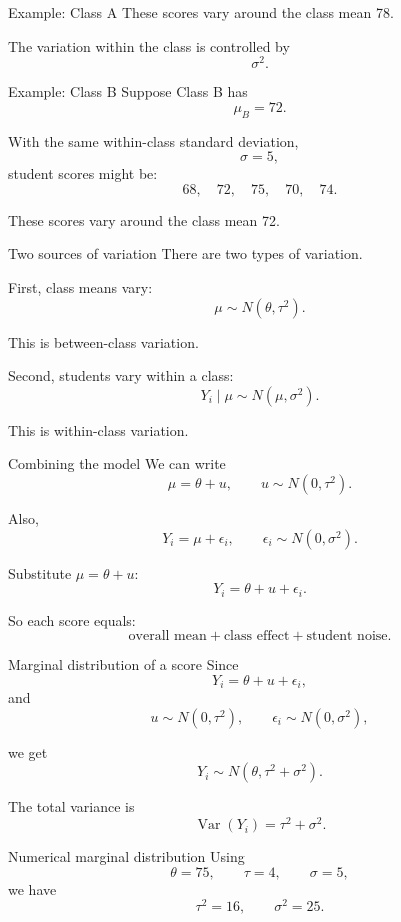 \documentclass[aspectratio=43,11pt]{beamer}
\begin{document}
{\begin{frame}{Example: Class A}
\medskip
These scores vary around the class mean 78.

\medskip
The variation within the class is controlled by
\[
\sigma^2.
\]
\end{frame}

\begin{frame}{Example: Class B}
Suppose Class B has
\[
\mu_B = 72.
\]

\medskip
With the same within-class standard deviation,
\[
\sigma = 5,
\]
student scores might be:
\[
68,\quad 72,\quad 75,\quad 70,\quad 74.
\]

These scores vary around the class mean 72.
\end{frame}

\begin{frame}{Two sources of variation}
There are two types of variation.

\medskip
First, class means vary:
\[
\mu \sim N(\theta,\tau^2).
\]

\medskip
This is between-class variation.

\medskip
Second, students vary within a class:
\[
Y_i \mid \mu \sim N(\mu,\sigma^2).
\]

\medskip
This is within-class variation.
\end{frame}

\begin{frame}{Combining the model}
We can write
\[
\mu = \theta + u,
\qquad
u \sim N(0,\tau^2).
\]

Also,
\[
Y_i = \mu + \epsilon_i,
\qquad
\epsilon_i \sim N(0,\sigma^2).
\]

Substitute \(\mu = \theta + u\):
\[
Y_i = \theta + u + \epsilon_i.
\]

So each score equals:
\[
\text{overall mean}
+
\text{class effect}
+
\text{student noise}.
\]
\end{frame}

\begin{frame}{Marginal distribution of a score}
Since
\[
Y_i = \theta + u + \epsilon_i,
\]
and
\[
u \sim N(0,\tau^2),
\qquad
\epsilon_i \sim N(0,\sigma^2),
\]

\medskip
we get
\[
Y_i \sim N(\theta,\tau^2+\sigma^2).
\]

The total variance is
\[
\operatorname{Var}(Y_i)=\tau^2+\sigma^2.
\]
\end{frame}

\begin{frame}{Numerical marginal distribution}
Using
\[
\theta = 75,
\qquad
\tau = 4,
\qquad
\sigma = 5,
\]
we have
\[
\tau^2 = 16,
\qquad
\sigma^2 = 25.
\]


\end{frame}}
\end{document}
